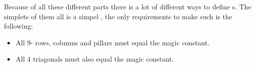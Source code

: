 Because of all these different parts there is a lot of different ways to define  \mcube{}s.
The simplets of them all is a simpel  \mcube{}, the only requirements to make such is the following:
\begin{itemize}
	\item All 9- rows, columns and pillars must equal the magic constant.
	\item All 4 triagonals must also equal the magic constant.
\end{itemize}


